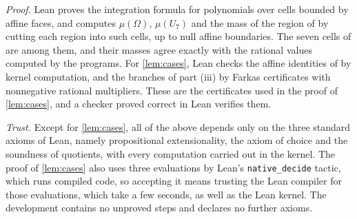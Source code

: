 \documentclass[11pt,colorlinks]{charlie}
\newcommand{\Om}{\Omega}
\begin{document}
\emph{Proof.} Lean proves the integration formula for polynomials over cells bounded by affine faces, and computes $\mu(\Om)$, $\mu(U_7)$ and the mass of the region of  by cutting each region into such cells, up to null affine boundaries. The seven cells of  are among them, and their masses agree exactly with the rational values computed by the programs. For \cref{lem:cases}, Lean checks the affine identities of  by kernel computation, and the branches of part (iii) by Farkas certificates with nonnegative rational multipliers. These are the certificates used in the proof of \cref{lem:cases}, and a checker proved correct in Lean verifies them.

\emph{Trust.} Except for \cref{lem:cases}, all of the above depends only on the three standard axioms of Lean, namely propositional extensionality, the axiom of choice and the soundness of quotients, with every computation carried out in the kernel. The proof of \cref{lem:cases} also uses three evaluations by Lean's \texttt{native\_decide} tactic, which runs compiled code, so accepting it means trusting the Lean compiler for those evaluations, which take a few seconds, as well as the Lean kernel. The development contains no unproved steps and declares no further axioms.
\end{document}
